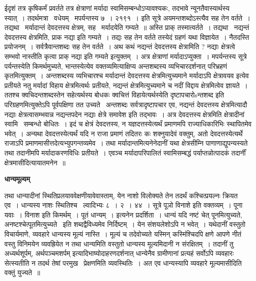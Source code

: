 \documentclass[11pt, openany]{book}
\begin{document}
ईदृशं तत्र कृषिकर्मं प्रवर्तते तत्र क्षेत्राणां मर्यादा स्वामिसम्बन्धोऽप्यावश्यकः, तदभावे न्यूनतैवास्यार्थस्य स्यात्~। तदर्थमत्रा \textendash\ वधेयम् \textendash\ मपर्यन्तस्य ७~। २१९१~। इति सूत्रे अयमन्तशब्दोऽस्त्यैव सह तेन वर्तते~। तद्यथा \textendash\ मर्यादान्तं देवदत्तस्य क्षेत्रम्, सह \textendash\ मर्यादयेति गम्यते~॥ अस्ति प्राक् तस्मात्वर्तते~। तद्यथा \textendash\ नद्यन्तं देवदत्तस्य क्षेत्रमिति, प्राक नद्या इति गम्यते~। तद्यः सह तेन वर्तते तस्येदं ग्रहणं यथा विज्ञायेत~। नैतदस्ति प्रयोजनम्~। सर्वत्रैवान्तशब्दः सह तेन वर्तते~। अथ कथं नद्यन्तं देवदत्तस्य क्षेत्रामिति ? नद्याः क्षेत्रत्वे सम्भवो नास्तीति कृत्वा प्राक् नद्या इति गम्यते इत्युक्तम्~। अत्र क्षेत्राणां मर्यादाऽप्युक्ता~। {\qt मपर्यन्तस्य} सूत्रे पर्यन्तस्येति किमर्थमुच्यते, भान्तस्येत्येव वक्तव्यमित्याक्षिप्य अन्तशब्दस्य व्यभिचारदर्शनात् परिभ्रहणं कृतमित्युक्तम्~। अन्तशब्दस्य व्यभिचारश्च मर्यादान्तं देवदत्तस्य क्षेत्रमित्युच्यमाने मर्यादाऽपि क्षेत्रावयव इत्येव प्रतीयते नतु मर्यादां विहाय क्षेत्रमित्वर्थः प्रतीयते, नद्यन्तं क्षेत्रमित्युच्यमाने च नदीं विद्दाय क्षेत्रमित्वेव ज्ञायते~। ततश्च क्वचिदन्तशब्दस्तेन सहेत्यर्थस्य बोधकः क्वचित्तं विहायेत्यर्थस्येति दृष्टापचारोsन्तशब्द इति परिग्रहणमित्युक्तेऽपि पूर्वपक्षिणा तत उच्यते \textendash\ अन्तशब्दः सर्वत्रादृष्टापचार एव, नद्यन्तं देवदत्तस्य क्षेत्रमित्यादौ नद्याः क्षेत्रत्वासम्भवान्न नद्यन्तपदेन नद्याः क्षेत्रे समावेश इति तद्भावः~। अत्र देवदत्तस्य क्षेत्रमिति क्षेत्रादीनां स्वामि \textendash\ सम्बन्धो बोधितः~। इदं च क्षेत्रं देवदत्तस्य, न यज्ञदत्तस्येत्यर्थं प्रमाणमपि राज्याधिकारिभिः स्थापितमेव भवेत्~। अन्यथा देवदत्तस्येत्यर्थं यदि न राजा प्रमाणं तदितरः कः शक्नुयादेवं वक्तुम्, अतो देवदत्तस्येत्यर्थे राजाऽपि प्रमाणमासीत्तदेत्यभ्युपगन्तव्यमेव~। तथा मर्यादान्तमित्यनेनेदानीं यथा क्षेत्रसीम्नि पाणाणाद्युपन्यस्यते तथा तदानीमपि मर्यादाकरणविधिः प्रतीयते~। एवञ्च मर्यादापरिपालितं स्वामिसम्बद्धं पर्याप्तन्नोत्पादकं तदार्नीं क्षेत्रमासीदित्यायातमनेन~॥

\begin{center}
\textbf{\Large धान्यमूल्यम् \textendash\ }
\end{center}

तथा धान्यादीनां स्थितिप्रलयाववेक्षणीयावेवास्ताम्, येन नाशो विलोक्यते तेन तदर्थं कश्चित्प्रयल्नः क्रियत एव~। धान्यस्य नाशः स्थितिश्च \textendash\ ल्वादिभ्यः ८~। २~। ४४~। सूत्रे पूञो विनाशे इति वक्तव्यम्~। पूना यवाः~। विनाश इति किमर्थम्~। {\qt पूतं धान्यम्~।} इत्यनेन प्रदर्शिता~। धान्यं यदि नष्टं चेत् पूनमित्युच्यते, अनष्टश्चेत्पूतमित्युच्यते \textendash\ इति शब्दद्वैविध्यमेव निर्दिष्टम्~। येन संशयलेशोऽपि न भवेत्~। यथेदानीं वस्तुतो विचार्यमाणे, व्यवहारे धान्यस्य मूल्यं नास्ति~। मूल्यं च तदेवोच्यते यस्मिन् कस्मिंश्चिदपि क्षणे आपणे नीतं वस्तु विनिमयेन व्यवह्रियेत न तथा धान्यमिति वस्तुतो धान्यस्य मूल्यमिदानी न संरक्षितम्~। तदानीं तु अध्यर्थशूर्पम्, अर्थपञ्चमशर्पम् इत्यादिभाष्योदाहरणदर्शनात् धान्येनैव ग्रामीणानां प्रत्यहं सर्वोऽपि व्यवहारः सेत्स्यतीति न तदर्थ तेषां परमुख \textendash\ प्रेक्षणमिति व्यवस्थितिः~। अत एव धान्यस्यापि व्यवहारे मूल्यमासीदिति वक्तुं युज्यते~॥\\
\end{document}
